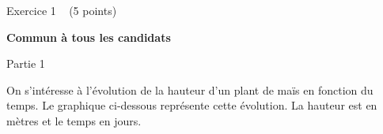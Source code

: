 
%
\begin{h2}Exercice 1   (5 points)\end{h2}
\textbf{Commun  à tous les candidats}
\begin{h3}Partie 1\end{h3}
On s'intéresse à l'évolution de la hauteur d'un plant de maïs en fonction du temps. Le graphique ci-dessous représente cette évolution. La hauteur est en mètres et le temps en jours.

\begin{center}
\end{center}

